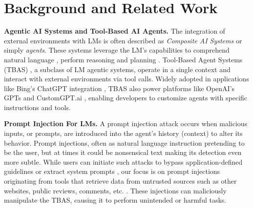 \section{Background and Related Work}
\textbf{Agentic AI Systems and Tool-Based AI Agents.}
The integration of external environments with LMs is often described as \textit{Composite AI Systems} \cite{compositeAI} or simply \textit{agents}\cite{llm_powered_agents,guide_to_llm_abst}. These systems leverage the LM’s capabilities to comprehend natural language \cite{ouyang2022instruction}, perform reasoning \cite{wei2023chainofthoughtpromptingelicitsreasoning,zelikman2024quietstarlanguagemodelsteach, renze2024selfreflectionllmagentseffects} and planning \cite{huang2022languagemodelszeroshotplanners, wang2023planandsolvepromptingimprovingzeroshot, masterman2024landscapeemergingaiagent}. Tool-Based Agent Systems (TBAS) \cite{ReAct}, a subclass of LM agentic systems, operate in a single context and interact with external environments via tool calls. Widely adopted in applications like Bing’s ChatGPT integration \cite{microsoft_AI_bing_chatgpt}, TBAS also power platforms like OpenAI’s GPTs \cite{openai_gpts} and CustomGPT.ai \cite{customgpt_ai}, enabling developers to customize agents with specific instructions and tools.

\textbf{Prompt Injection For LMs.}
A prompt injection attack\cite{liu2024formalizing, liu2024promptinjectionattackllmintegrated} occurs when malicious inputs, or prompts, are introduced into the agent’s history (context) to alter its behavior. Prompt injections, often as natural language instruction pretending to be the user, but at times it could be nonsensical text making its detection even more subtle\cite{zou2023universalattack}. While users can initiate such attacks to bypass application-defined guidelines \cite{liu2024autodangeneratingstealthyjailbreak} or extract system prompts \cite{yang2024prsapromptstealingattacks}, our focus is on prompt injections originating from tools that retrieve data from untrusted sources such as other websites, public reviews, comments, etc. \cite{debenedetti2024agentdojo,zhan2024injecagentbenchmarkingindirectprompt}. These injections can maliciously manipulate the TBAS, causing it to perform unintended or harmful tasks. 

